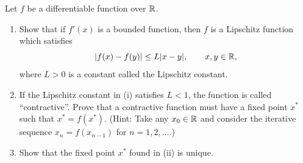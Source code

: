 \begingroup
\renewcommand{\labelenumi}{(\roman{enumi})}
\begin{exercise}
  \label{ex:hw07:contractive-fixed-point}
  Let $f$ be a differentiable function over $\mathbb{R}$.
  \begin{enumerate}
    \item Show that if $f'(x)$ is a bounded function, then $f$ is a
      Lipschitz function which satisfies
      \[
        |f(x)-f(y)|\le L|x-y|,\qquad x,y\in\mathbb{R},
      \]
      where $L>0$ is a constant called the Lipschitz constant.
    \item If the Lipschitz constant in (i) satisfies $L<1$, the function
      is called ``contractive''. Prove that a contractive function must
      have a fixed point $x^*$ such that $x^*=f(x^*)$.
      (Hint: Take any $x_0\in\mathbb{R}$ and consider the iterative sequence
      $x_n=f(x_{n-1})$ for $n=1,2,\ldots$.)
    \item Show that the fixed point $x^*$ found in (ii) is unique.
  \end{enumerate}
\end{exercise}
\endgroup
